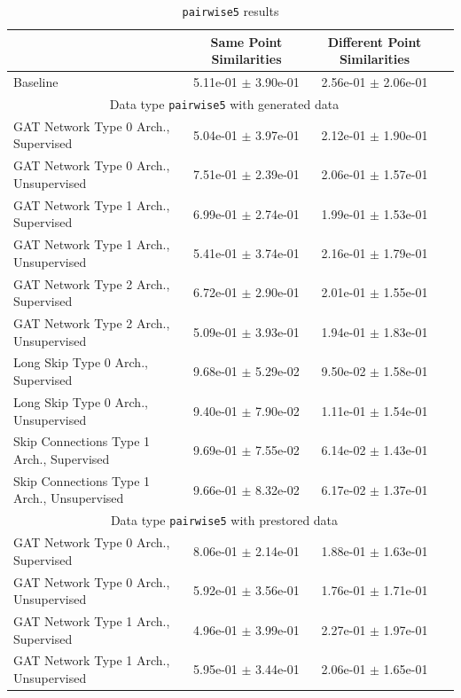 \documentclass[a4paper]{article}
\begin{document}
\begin{table}[H]
  \caption{\texttt{pairwise5} results}
      \begin{tabular}{|l|c|c|c|} \hline
                                      &  Same Point Similarities  &  Different Point Similarities  \\ \hline
Baseline   & 5.11e-01 $\pm$ 3.90e-01 & 2.56e-01 $\pm$ 2.06e-01 \\ \hline
\multicolumn{3}{|c|}{Data type \texttt{pairwise5} with generated data} \\ \hline
GAT Network Type 0 Arch., Supervised   & 5.04e-01 $\pm$ 3.97e-01 & 2.12e-01 $\pm$ 1.90e-01 \\ \hline
GAT Network Type 0 Arch., Unsupervised   & 7.51e-01 $\pm$ 2.39e-01 & 2.06e-01 $\pm$ 1.57e-01 \\ \hline
GAT Network Type 1 Arch., Supervised   & 6.99e-01 $\pm$ 2.74e-01 & 1.99e-01 $\pm$ 1.53e-01 \\ \hline
GAT Network Type 1 Arch., Unsupervised   & 5.41e-01 $\pm$ 3.74e-01 & 2.16e-01 $\pm$ 1.79e-01 \\ \hline
GAT Network Type 2 Arch., Supervised   & 6.72e-01 $\pm$ 2.90e-01 & 2.01e-01 $\pm$ 1.55e-01 \\ \hline
GAT Network Type 2 Arch., Unsupervised   & 5.09e-01 $\pm$ 3.93e-01 & 1.94e-01 $\pm$ 1.83e-01 \\ \hline
Long Skip Type 0 Arch., Supervised   & 9.68e-01 $\pm$ 5.29e-02 & 9.50e-02 $\pm$ 1.58e-01 \\ \hline
Long Skip Type 0 Arch., Unsupervised   & 9.40e-01 $\pm$ 7.90e-02 & 1.11e-01 $\pm$ 1.54e-01 \\ \hline
Skip Connections Type 1 Arch., Supervised   & 9.69e-01 $\pm$ 7.55e-02 & 6.14e-02 $\pm$ 1.43e-01 \\ \hline
Skip Connections Type 1 Arch., Unsupervised   & 9.66e-01 $\pm$ 8.32e-02 & 6.17e-02 $\pm$ 1.37e-01 \\ \hline
\multicolumn{3}{|c|}{Data type \texttt{pairwise5} with prestored data} \\ \hline
GAT Network Type 0 Arch., Supervised   & 8.06e-01 $\pm$ 2.14e-01 & 1.88e-01 $\pm$ 1.63e-01 \\ \hline
GAT Network Type 0 Arch., Unsupervised   & 5.92e-01 $\pm$ 3.56e-01 & 1.76e-01 $\pm$ 1.71e-01 \\ \hline
GAT Network Type 1 Arch., Supervised   & 4.96e-01 $\pm$ 3.99e-01 & 2.27e-01 $\pm$ 1.97e-01 \\ \hline
GAT Network Type 1 Arch., Unsupervised   & 5.95e-01 $\pm$ 3.44e-01 & 2.06e-01 $\pm$ 1.65e-01 \\ \hline

\end{tabular}
\end{table}
\end{document}
